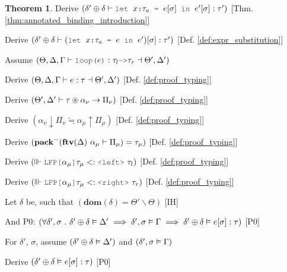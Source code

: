 \documentclass[acmsmall]{acmart}
\theoremstyle{definition}
\newtheorem{theorem}{Theorem}[section]
\begin{document}
\begin{theorem}
  \item \I\I \N Derive $(
    \delta' \oplus \delta \entails \J{let } x \J{:} \tau_a \J{ = } e[\sigma] \J{ in } e'[\sigma] \hastype \tau'
  )$ [Thm. \ref{thm:annotated_binding_introduction}]

  \item \I\I \N Derive $(
    \delta' \oplus \delta \entails (\J{let } x \J{:} \tau_a \J{ = } e \J{ in } e')[\sigma] \hastype \tau'
  )$ [Def. \ref{def:expr_substitution}]


  \item \N Assume $(
    \Theta, \Delta, \Gamma \entails \J{loop(}e\J{)} \hastype 
    \tau_l \J{->} \tau_r \given \Theta', \Delta'
  )$
  \item \I \N Derive $(
    \Theta, \Delta, \Gamma \vdash e : \tau \dashv  \Theta', \Delta'
  )$ [Def. \ref{def:proof_typing}]
  \item \I \N Derive $(
    \Theta', \Delta' \vdash \tau \circledast \alpha_\nu \rightarrow \Pi_\nu
  )$ [Def. \ref{def:proof_typing}]
  \item \I \N Derive $(
    \alpha_\nu \downarrow \Pi_\nu \fallingdotseq \alpha_\mu \uparrow \Pi_\mu
  )$ [Def. \ref{def:proof_typing}]
  \item \I \N Derive $(
    \textbf{pack}^-(\textbf{ftv}(\Delta)\ \alpha_\mu \vdash \Pi_\mu) = \tau_\mu
  )$ [Def. \ref{def:proof_typing}]
  \item \I \N Derive $(
    \factorsinto \J{LFP[} \alpha_\mu \J{]}\tau_\mu \subtypes \J{<left>}\ \tau_l
  )$ [Def. \ref{def:proof_typing}]
  \item \I \N Derive $(
    \factorsinto \J{LFP[} \alpha_\mu \J{]}\tau_\mu \subtypes \J{<right>}\ \tau_r
  )$ [Def. \ref{def:proof_typing}]

  \item \I \N Let $\delta$ be, such that $(
    \textbf{dom}(\delta) = \Theta' \backslash \Theta
  )$ [IH]
  \item \I \N And P0: $(
    \forall \delta', \sigma \ .\  
    \delta' \oplus \delta \vDash \Delta' \implies
    \delta', \sigma \vDash \Gamma \implies
    \delta' \oplus \delta \vDash e[\sigma] : \tau
  )$ [P0]

  \item \I \N For $\delta'$, $\sigma$,
    assume $(\delta' \oplus \delta \vDash \Delta')$
    and $(\delta', \sigma \vDash \Gamma)$

  \item \I\I \N Derive $(
    \delta' \oplus \delta \vDash e[\sigma] : \tau
  )$ [P0]


\end{theorem}
\end{document}
